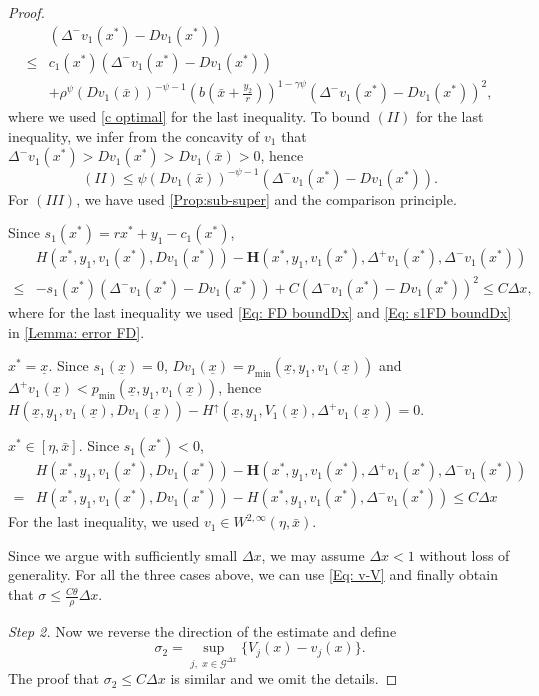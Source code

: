 \documentclass[11pt]{article}
\numberwithin{equation}{section}
\numberwithin{algorithm}{section}
\newcommand{\lc}{\left(}
\newcommand{\rc}{\right)}
\newcommand{\ux}{{\underline x}}
\newcommand{\g}{\gamma}
\newcommand{\p}{\psi}
\theoremstyle{plain}
\newcommand{\D}{\Delta}
\begin{document}
\begin{proof}
$$\begin{aligned}
&\lc \D^-{v_{1}(x^*)}-Dv_{1}(x^*)\rc\\
\leq {}& c_1(x^*)\lc \D^-{v_{1}(x^*)}-Dv_{1}(x^*)\rc\\
&+\rho^{\p}\lc Dv_{1}(\bar{x})\rc^{-\psi-1}\lc b\lc \bar{x}+\frac{y_2}{r}\rc\rc^{1-\g \p}\lc \D^-{v_{1}(x^*)}-Dv_{1}(x^*)\rc^2,
\end{aligned}
$$
where we used \cref{c optimal} for the last inequality. To bound $(II)$ for the last inequality, we infer from the concavity of $v_1$ that $\D^-{v_{1}(x^*)}>Dv_{1}(x^*)>Dv_{1}(\bar{x})>0$, hence  
$$
(II)\leq \psi \lc Dv_{1}(\bar{x})\rc^{-\psi-1}\lc \D^-{v_{1}(x^*)}-Dv_{1}(x^*)\rc.
$$
For $(III)$, we have used \cref{Prop:sub-super} and the comparison principle. \par
Since $s_1(x^*)=rx^*+y_1-c_1(x^*)$,
$$
\begin{aligned}
&H\lc x^*,y_{1},v_{1}(x^*),Dv_{1}(x^*)\rc-\boldsymbol{H}\lc x^*,y_{1},v_{1}(x^*),\D^+{v_{1}(x^*)},\D^-{v_{1}(x^*)}\rc \\
\leq {}&-s_1(x^*)\lc \D^-{v_{1}(x^*)}-Dv_{1}(x^*)\rc+C\lc \D^-{v_{1}(x^*)}-Dv_{1}(x^*)\rc^2 \leq C\D x,
\end{aligned}
$$
where for the last inequality we used \cref{Eq: FD boundDx} and \cref{Eq: s1FD boundDx} in \cref{Lemma: error FD}.\par
\noindent {} $x^*=\ux$. Since $s_1(\ux)=0$, $Dv_{1}(\ux)=p_{\min}\lc \ux,y_{1},v_{1}(\ux)\rc$ and $\D^+v_{1}(\ux)<p_{\min}\lc \ux,y_{1},v_{1}(\ux)\rc$, hence 
$
H\lc \ux,y_{1},v_{1}(\ux),Dv_{1}(\ux)\rc-{H}^{\uparrow}\lc \ux,y_{1},V_{1}(\ux),\D^+{v_{1}(\ux)}\rc=0.
$\par 

\noindent  {} $x^*\in [\eta,\bar{x}]$. Since $s_{1}(x^*)<0$, 
$$
\begin{aligned}
&H\lc x^*,y_{1},v_{1}(x^*),Dv_{1}(x^*)\rc-\boldsymbol{H}\lc x^*,y_{1},v_{1}(x^*),\D^+{v_{1}(x^*)},\D^-{v_{1}(x^*)}\rc \\
= {}& H\lc x^*,y_{1},v_{1}(x^*),Dv_{1}(x^*)\rc-H\lc x^*,y_{1},v_{1}(x^*),\D^-{v_{1}(x^*)}\rc \leq C\D x
\end{aligned}
$$
For the last inequality, we used $v_1\in W^{2,\infty}(\eta,\bar{x})$.\par 
Since we argue with sufficiently small $\D x$, we may assume $\D x<1$ without loss of generality. For all the three cases above, we can use \cref{Eq: v-V} and finally obtain that
$
\sigma\leq  \frac{C\theta}{\rho} \D x$.\par

{\it{Step 2.}} Now we reverse the direction of the estimate and define
$$
\sigma_2=\sup_{j,\,\,x\in \mathcal{G}^{\D x}} \{V_j(x)-v_{j}(x)\}.
$$
The proof that $\sigma_2\leq  C \D x$ is similar and we omit the details. 
\end{proof}
\end{document}
